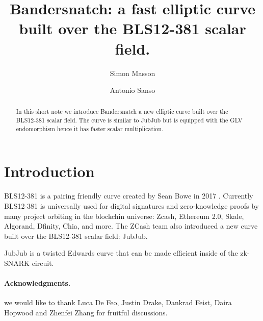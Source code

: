 \documentclass{amsart}
\begin{document}
\title[Bandersnatch]{Bandersnatch: a fast elliptic curve built over the BLS12-381 scalar field.}
\author{Simon Masson}
\address{Heliax}
\author{Antonio Sanso}
\address{Ethereum Foundation and Ruhr Universit{\"a}t Bochum}


\maketitle
\medskip
\begin{abstract}
 In this short note we  introduce Bandersnatch a new elliptic curve built over the BLS12-381 \cite{bls12381} scalar field. The curve is similar to JubJub  \cite{jubjub} but is equipped with the GLV endomorphism \cite{10.1007/3-540-44647-8_11} hence it has faster scalar multiplication.
 \end{abstract}

\section{Introduction} 
BLS12-381 is a pairing friendly curve created by Sean Bowe in 2017 \cite{bls12381}. Currently BLS12-381 is universally used for digital signatures and zero-knowledge proofs by many project orbiting in the 
blockchin universe: Zcash, Ethereum 2.0, Skale, Algorand, Dfinity, Chia, and more. The ZCash team also introduced a new curve built over the BLS12-381 scalar field: JubJub.

JubJub is a twisted Edwards curve that can be made efficient inside of the zk-SNARK circuit.

\medskip
\paragraph*{Acknowledgments.} we would like to thank Luca De Feo, Justin Drake, Dankrad Feist, Daira Hopwood and Zhenfei Zhang for fruitful discussions.

{}

\end{document}
